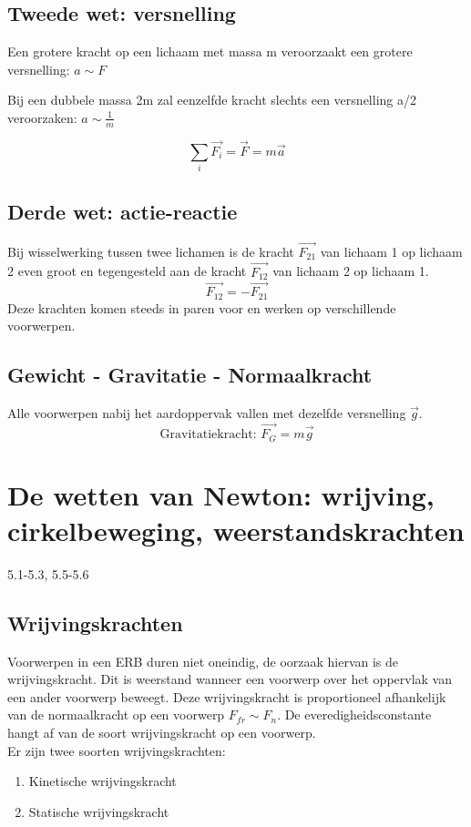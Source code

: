 \documentclass[12pt,a4paper]{article}
\begin{document}
    \subsection{Tweede wet: versnelling}
    Een grotere kracht op een lichaam met massa m veroorzaakt een grotere versnelling: $a \sim F$

    Bij een dubbele massa 2m zal eenzelfde kracht slechts een versnelling a/2 veroorzaken: $a \sim \frac{1}{m}$

    \[\sum_{i} \vec{F_i} = \vec{F} = m\vec{a}\]

    \subsection{Derde wet: actie-reactie}
    Bij wisselwerking tussen twee lichamen is de kracht \(\vec{F_{21}}\) van lichaam 1 op lichaam 2 even groot en tegengesteld aan de kracht \(\vec{F_{12}}\) van lichaam 2 op lichaam 1.
    \[\vec{F_{12}} = -\vec{F_{21}}\]
    Deze krachten komen steeds in paren voor en werken op verschillende voorwerpen.

    \subsection{Gewicht - Gravitatie - Normaalkracht}
    Alle voorwerpen nabij het aardoppervak vallen met dezelfde versnelling $\vec{g}$.
    \[\text{Gravitatiekracht: } \vec{F_G} = m\vec{g}\]


    \section{De wetten van Newton: wrijving, cirkelbeweging, weerstandskrachten}
    5.1-5.3, 5.5-5.6
    
    \subsection{Wrijvingskrachten}
    Voorwerpen in een ERB duren niet oneindig, de oorzaak hiervan is de wrijvingskracht. Dit is weerstand wanneer een voorwerp
    over het oppervlak van een ander voorwerp beweegt. Deze wrijvingskracht is proportioneel afhankelijk van de normaalkracht
    op een voorwerp $F_{fr} \sim F_{n}$.  De everedigheidsconstante hangt af van de soort wrijvingskracht op een voorwerp.\\
    
    Er zijn twee soorten wrijvingskrachten:
    \begin{enumerate}
            [label=\alph*)]
            \item Kinetische wrijvingskracht
            \item Statische wrijvingskracht
        \end{enumerate}
        
\end{document}
